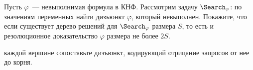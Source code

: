 Пусть $\varphi$~--- невыполнимая формула в КНФ. Рассмотрим задачу $\Search_{\varphi}$: по значениям
переменных найти дизъюнкт $\varphi$, который невыполнен. Покажите, что если существует дерево решений для
$\Search_{\varphi}$ размера $S$, то есть и резолюционное доказательство $\varphi$ размера не более $2S$.

 каждой вершине сопоставьте дизъюнкт, кодирующий отрицание запросов от нее до корня.
